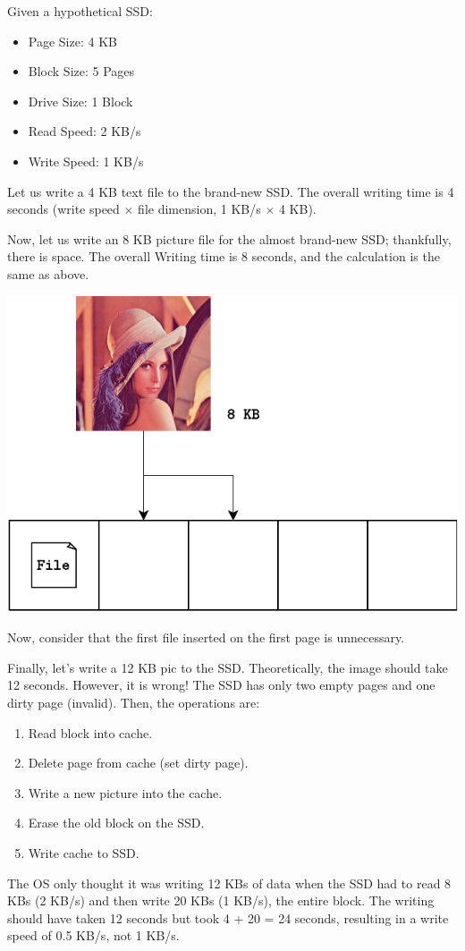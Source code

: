 \begin{examplebox}
    Given a hypothetical SSD:
    \begin{itemize}
        \item Page Size: 4 KB
        \item Block Size: 5 Pages
        \item Drive Size: 1 Block
        \item Read Speed: 2 KB/s
        \item Write Speed: 1 KB/s
    \end{itemize}
    Let us write a 4 KB text file to the brand-new SSD. The overall writing time is 4 seconds (write speed $\times$ file dimension, 1 KB/s $\times$ 4 KB).

    \newpage

    Now, let us write an 8 KB picture file for the almost brand-new SSD; thankfully, there is space. The overall Writing time is 8 seconds, and the calculation is the same as above.

    \begin{center}
        \includegraphics[width=.7\textwidth]{img/SSD-1.pdf}
    \end{center}
    Now, consider that the first file inserted on the first page is unnecessary.

    \highspace
    Finally, let's write a 12 KB pic to the SSD. Theoretically, the image should take 12 seconds. However, it is wrong! The SSD has only two empty pages and one dirty page (invalid). Then, the operations are:
    \begin{enumerate}
        \item Read block into cache.
        \item Delete page from cache (set dirty page).
        \item Write a new picture into the cache.
        \item Erase the old block on the SSD.
        \item Write cache to SSD.
    \end{enumerate}
    The OS only thought it was writing 12 KBs of data when the SSD had to read 8 KBs (2 KB/s) and then write 20 KBs (1 KB/s), the entire block. The writing should have taken 12 seconds but took 4 + 20 = 24 seconds, resulting in a write speed of 0.5 KB/s, not 1 KB/s.
\end{examplebox}

